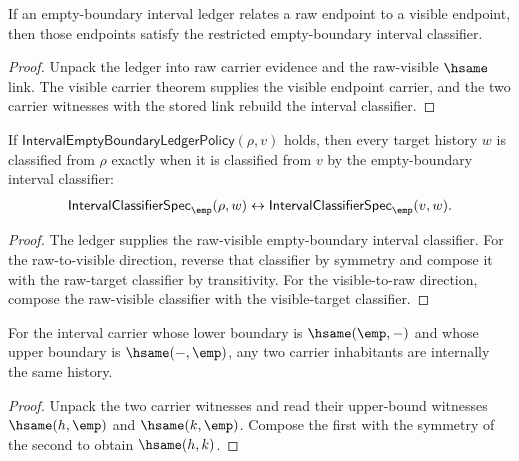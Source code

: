 \begin{theorem}
\label{thm:interval-empty-boundary-ledger-raw-visible-classifier}
If an empty-boundary interval ledger relates a raw endpoint to a visible
endpoint, then those endpoints satisfy the restricted empty-boundary interval
classifier.
\end{theorem}
\begin{proof}
Unpack the ledger into raw carrier evidence and the raw-visible \(\hsame\)
link. The visible carrier theorem supplies the visible endpoint carrier, and
the two carrier witnesses with the stored link rebuild the interval classifier.
\end{proof}

\begin{theorem}
\label{thm:interval-empty-boundary-ledger-classifier-endpoint-equivalence}
If $\mathsf{IntervalEmptyBoundaryLedgerPolicy}(\rho,v)$ holds, then every
target history $w$ is classified from $\rho$ exactly when it is classified from
$v$ by the empty-boundary interval classifier:
$$
\mathsf{IntervalClassifierSpec}_{\emp}(\rho,w)\leftrightarrow
\mathsf{IntervalClassifierSpec}_{\emp}(v,w).
$$
\end{theorem}
\begin{proof}
The ledger supplies the raw-visible empty-boundary interval classifier. For the
raw-to-visible direction, reverse that classifier by symmetry and compose it
with the raw-target classifier by transitivity. For the visible-to-raw
direction, compose the raw-visible classifier with the visible-target
classifier.
\end{proof}

\begin{theorem}
\label{thm:interval-empty-boundary-carrier-uniqueness}
For the interval carrier whose lower boundary is \(\hsame(\emp,-)\) and whose
upper boundary is \(\hsame(-,\emp)\), any two carrier inhabitants are
internally the same history.
\end{theorem}
\begin{proof}
Unpack the two carrier witnesses and read their upper-bound witnesses
\(\hsame(h,\emp)\) and \(\hsame(k,\emp)\). Compose the first with the symmetry
of the second to obtain \(\hsame(h,k)\).
\end{proof}

